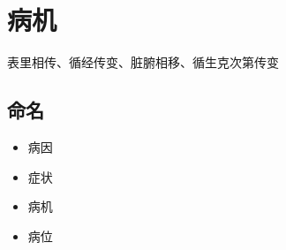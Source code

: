 \section{病机}
表里相传、循经传变、脏腑相移、循生克次第传变
\subsection{命名}
\begin{itemize}
  \item 病因
  \item 症状
  \item 病机
  \item 病位
\end{itemize}
